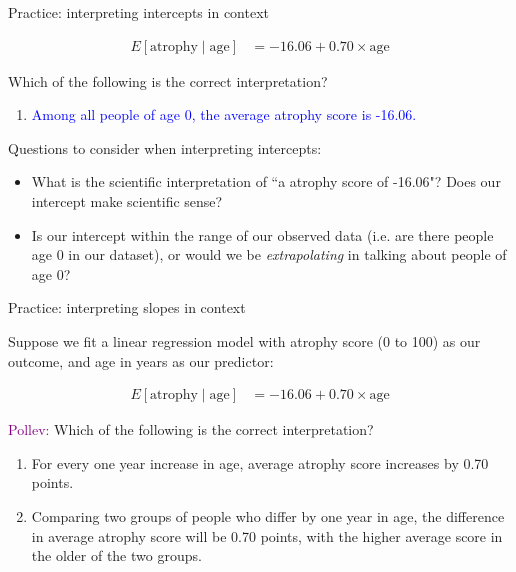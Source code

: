 \documentclass[10pt,t]{beamer}
\begin{document}
\begin{frame}{Practice: interpreting intercepts in context}


\begin{align*}
E[\text{atrophy} \mid \text{age}] & = -16.06 + 0.70 \times \text{age}
\end{align*}

Which of the following is the correct interpretation?

\vspace{0.3cm}

\begin{enumerate}
	\item[] \textcolor{blue}{Among all people of age $0$, the average atrophy score is -16.06.}
\end{enumerate}

Questions to consider when interpreting intercepts:

\begin{itemize}
	\item What is the scientific interpretation of ``a atrophy score of -16.06"? Does our intercept make scientific sense?
	\item Is our intercept within the range of our observed data (i.e. are there people age $0$ in our dataset), or would we be \textit{extrapolating} in talking about people of age $0$?
\end{itemize}

\end{frame}

\begin{frame}{Practice: interpreting slopes in context}

Suppose we fit a linear regression model with atrophy score (0 to 100) as our outcome, and age in years as our predictor:

\begin{align*}
E[\text{atrophy} \mid \text{age}] & = -16.06 + 0.70 \times \text{age}
\end{align*}


\textcolor{purple}{Pollev:} Which of the following is the correct interpretation?

\begin{enumerate}
	\item For every one year increase in age, average atrophy score increases by 0.70 points.
	\item Comparing two groups of people who differ by one year in age, the difference in average atrophy score will be 0.70 points, with the higher average score in the older of the two groups.
\end{enumerate}

\end{frame}
\end{document}
